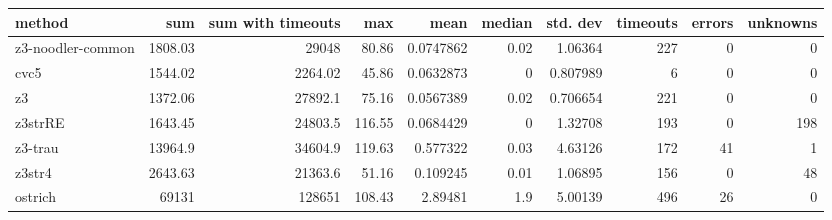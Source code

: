 \begin{tabular}{lrrrrrrrrr}
\hline
 method            &      sum &   sum with timeouts &    max &      mean &   median &   std. dev &   timeouts &   errors &   unknowns \\
\hline
 z3-noodler-common &  1808.03 &            29048    &  80.86 & 0.0747862 &     0.02 &   1.06364  &        227 &        0 &          0 \\
 cvc5              &  1544.02 &             2264.02 &  45.86 & 0.0632873 &     0    &   0.807989 &          6 &        0 &          0 \\
 z3                &  1372.06 &            27892.1  &  75.16 & 0.0567389 &     0.02 &   0.706654 &        221 &        0 &          0 \\
 z3strRE           &  1643.45 &            24803.5  & 116.55 & 0.0684429 &     0    &   1.32708  &        193 &        0 &        198 \\
 z3-trau           & 13964.9  &            34604.9  & 119.63 & 0.577322  &     0.03 &   4.63126  &        172 &       41 &          1 \\
 z3str4            &  2643.63 &            21363.6  &  51.16 & 0.109245  &     0.01 &   1.06895  &        156 &        0 &         48 \\
 ostrich           & 69131    &           128651    & 108.43 & 2.89481   &     1.9  &   5.00139  &        496 &       26 &          0 \\
\hline
\end{tabular}
